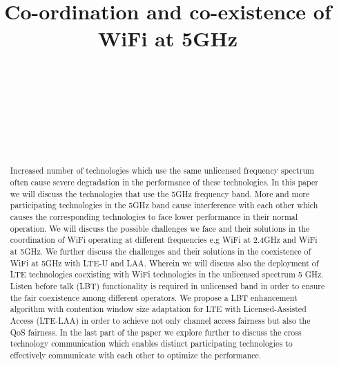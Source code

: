 \documentclass{IEEEtran}
\begin{document}
\title{Co-ordination and co-existence of WiFi at 5GHz}


\author{
 \\
\and
{}
 \\
\and
{}
 \\
\and
{}
 \\
}




\maketitle

\begin{abstract}
Increased number of  technologies which use the same unlicensed frequency spectrum often cause severe degradation in the performance of these technologies. In this paper we will discuss the technologies that use the 5GHz frequency band. More and more participating technologies in the 5GHz band cause interference with each other which causes the corresponding technologies to face lower performance in their normal operation. We will discuss the possible challenges we face and their solutions in the coordination of WiFi operating at different frequencies e.g WiFi at 2.4GHz and WiFi at 5GHz. We further discuss the challenges and their solutions in the coexistence of WiFi at 5GHz with LTE-U and LAA. Wherein we will discuss also the deployment of LTE technologies coexisting with WiFi technologies in the unlicensed spectrum 5 GHz. Listen before talk (LBT) functionality is required in unlicensed band in order to ensure the fair coexistence among different operators. We propose a LBT enhancement algorithm with contention window size adaptation for LTE with Licensed-Assisted Access (LTE-LAA) in order to achieve not only channel access fairness but also the QoS fairness. In the last part of the paper we explore further to discuss the cross technology communication which enables distinct participating technologies to effectively communicate with each other to optimize the performance.
\end{abstract}
\end{document}
